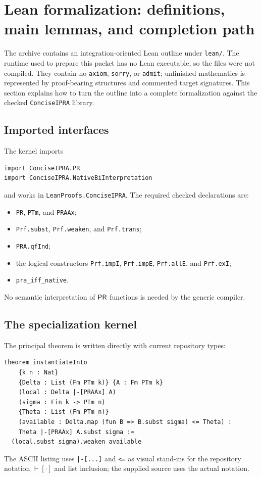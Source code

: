 \section{Lean formalization: definitions, main lemmas, and completion path}
\label{sec:lean}

The archive contains an integration-oriented Lean outline under \texttt{lean/}.  The runtime used to prepare
this packet has no Lean executable, so the files were not compiled.  They contain no \texttt{axiom},
\texttt{sorry}, or \texttt{admit}; unfinished mathematics is represented by proof-bearing structures and
commented target signatures.  This section explains how to turn the outline into a complete formalization
against the checked \texttt{ConciseIPRA} library.

\subsection{Imported interfaces}

The kernel imports
\begin{lstlisting}[language={}]
import ConciseIPRA.PR
import ConciseIPRA.NativeBiInterpretation
\end{lstlisting}
and works in \texttt{LeanProofs.ConciseIPRA}.  The required checked declarations are:
\begin{itemize}
  \item \texttt{PR}, \texttt{PTm}, and \texttt{PRAAx};
  \item \texttt{Prf.subst}, \texttt{Prf.weaken}, and \texttt{Prf.trans};
  \item \texttt{PRA.qfInd};
  \item the logical constructors \texttt{Prf.impI}, \texttt{Prf.impE},
        \texttt{Prf.allE}, and \texttt{Prf.exI};
  \item \texttt{pra\_iff\_native}.
\end{itemize}
No semantic interpretation of \(\mathsf{PR}\) functions is needed by the generic compiler.

\subsection{The specialization kernel}

The principal theorem is written directly with current repository types:
\begin{lstlisting}[language={}]
theorem instantiateInto
    {k n : Nat}
    {Delta : List (Fm PTm k)} {A : Fm PTm k}
    (local : Delta |-[PRAAx] A)
    (sigma : Fin k -> PTm n)
    {Theta : List (Fm PTm n)}
    (available : Delta.map (fun B => B.subst sigma) <= Theta) :
    Theta |-[PRAAx] A.subst sigma :=
  (local.subst sigma).weaken available
\end{lstlisting}
The ASCII listing uses \texttt{|-[...]} and \texttt{<=} as visual stand-ins for the repository notation
\(\vdash[\cdot]\) and list inclusion; the supplied source uses the actual notation.

